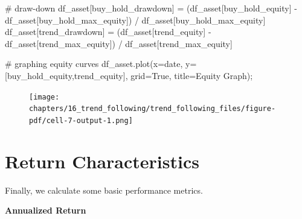 \documentclass[
  letterpaper,
  DIV=11,
  numbers=noendperiod]{scrreprt}
\newenvironment{Shaded}{\begin{snugshade}}{\end{snugshade}}
\newcommand{\CommentTok}[1]{\textcolor[rgb]{0.37,0.37,0.37}{#1}}
\newcommand{\NormalTok}[1]{\textcolor[rgb]{0.00,0.23,0.31}{#1}}
\newcommand{\OperatorTok}[1]{\textcolor[rgb]{0.37,0.37,0.37}{#1}}
\newcommand{\StringTok}[1]{\textcolor[rgb]{0.13,0.47,0.30}{#1}}
\newcommand{\VariableTok}[1]{\textcolor[rgb]{0.07,0.07,0.07}{#1}}
\begin{document}
\begin{Shaded}
\begin{Highlighting}[]
\CommentTok{\# draw{-}down}
\NormalTok{df\_asset[}\StringTok{\textquotesingle{}buy\_hold\_drawdown\textquotesingle{}}\NormalTok{] }\OperatorTok{=}\NormalTok{ (df\_asset[}\StringTok{\textquotesingle{}buy\_hold\_equity\textquotesingle{}}\NormalTok{] }\OperatorTok{{-}}\NormalTok{ df\_asset[}\StringTok{\textquotesingle{}buy\_hold\_max\_equity\textquotesingle{}}\NormalTok{]) }\OperatorTok{/}\NormalTok{ df\_asset[}\StringTok{\textquotesingle{}buy\_hold\_max\_equity\textquotesingle{}}\NormalTok{]}
\NormalTok{df\_asset[}\StringTok{\textquotesingle{}trend\_drawdown\textquotesingle{}}\NormalTok{] }\OperatorTok{=}\NormalTok{ (df\_asset[}\StringTok{\textquotesingle{}trend\_equity\textquotesingle{}}\NormalTok{] }\OperatorTok{{-}}\NormalTok{ df\_asset[}\StringTok{\textquotesingle{}trend\_max\_equity\textquotesingle{}}\NormalTok{]) }\OperatorTok{/}\NormalTok{ df\_asset[}\StringTok{\textquotesingle{}trend\_max\_equity\textquotesingle{}}\NormalTok{]}

\CommentTok{\# graphing equity curves}
\NormalTok{df\_asset.plot(x}\OperatorTok{=}\StringTok{\textquotesingle{}date\textquotesingle{}}\NormalTok{, y}\OperatorTok{=}\NormalTok{[}\StringTok{\textquotesingle{}buy\_hold\_equity\textquotesingle{}}\NormalTok{,}\StringTok{\textquotesingle{}trend\_equity\textquotesingle{}}\NormalTok{], grid}\OperatorTok{=}\VariableTok{True}\NormalTok{, title}\OperatorTok{=}\StringTok{\textquotesingle{}Equity Graph\textquotesingle{}}\NormalTok{)}\OperatorTok{;}
\end{Highlighting}
\end{Shaded}

\begin{figure}[H]

{\centering \texttt{[image: chapters/16\_trend\_following/trend\_following\_files/figure-pdf/cell-7-output-1.png]}

}

\end{figure}

\hypertarget{return-characteristics}{%
\section{Return Characteristics}\label{return-characteristics}}

Finally, we calculate some basic performance metrics.

\textbf{Annualized Return}
\end{document}
